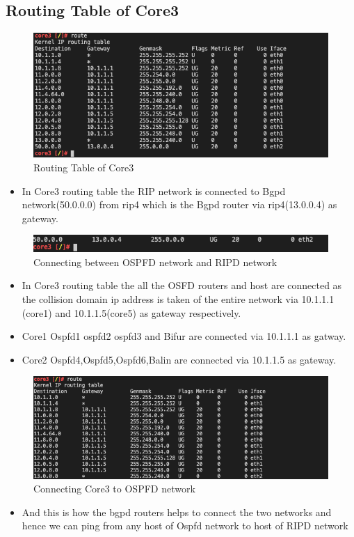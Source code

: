 \subsection{Routing Table of Core3}
 \begin{figure}[H]
\centering
  \includegraphics[width=1.3\textwidth]{Images/Routing table of core3.png}
  \caption{Routing Table of Core3}
  \label{fig }
\end{figure}
\begin{itemize}
    \item In Core3 routing table the RIP network is connected to Bgpd network(50.0.0.0) from rip4 which is the Bgpd router via rip4(13.0.0.4) as gateway.
    \end{itemize}
 \begin{figure}[H]
\centering
  \includegraphics[width=1.3\textwidth]{Images/core3 route 2.png}
  \caption{Connecting between OSPFD network and RIPD network}
  \label{fig }
\end{figure}
\begin{itemize}
    \item In Core3 routing table the all the OSFD routers and host are connected as the collision domain ip address is taken of the entire network via 10.1.1.1 (core1) and 10.1.1.5(core5) as gateway respectively.
    \item Core1 Ospfd1 ospfd2 ospfd3 and Bifur are connected via 10.1.1.1 as gatway.
    \item Core2 Ospfd4,Ospfd5,Ospfd6,Balin are connected via 10.1.1.5 as gateway.
    \end{itemize}
 \begin{figure}[H]
 \centering
  \includegraphics[width=1.3\textwidth]{Images/core3 route3.png}
  \caption{Connecting Core3 to OSPFD network}
  \label{fig }
\end{figure}
\begin{itemize}
    \item And this is how the bgpd routers helps to connect the two networks and hence we can ping from any host of Ospfd network to host of RIPD network
\end{itemize}